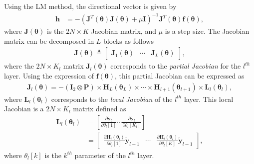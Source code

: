 \documentclass{article}
\begin{document}
Using the LM method, the directional vector is given by
\begin{align}
\mathbf{h}&=-(\mathbf{J}^T(\boldsymbol \theta)\mathbf{J}(\boldsymbol \theta)+\mu \mathbf{I})^{-1}\mathbf{J}^T (\boldsymbol \theta)\mathbf{f}(\boldsymbol \theta),\label{eqgrad2}
\end{align}
where $\mathbf{J}(\boldsymbol \theta)$ is the $2N\times K$ Jacobian matrix, and $\mu$ is a step size. The Jacobian matrix can be decomposed in $L$ blocks as follows 
\begin{align}
\mathbf{J}(\boldsymbol \theta) \triangleq 
\begin{bmatrix}
\mathbf{J}_1(\boldsymbol \theta)&\cdots&\mathbf{J}_L(\boldsymbol \theta)
\end{bmatrix},\label{eqJTOT}
\end{align}
where the $2N\times K_l$ matrix $ \mathbf{J}_l(\boldsymbol \theta)$ corresponds to the \emph{partial Jacobian} for the $l^{th}$ layer. Using the expression of $\mathbf{f}(\boldsymbol \theta)$, this partial Jacobian can be expressed as
\begin{align}
\mathbf{J}_l(\boldsymbol \theta)=-\left(\mathbf{I}_2\otimes \mathbf{P}\right) \times \mathbf{H}_{L}(\boldsymbol \theta_L)\times \cdots \times \mathbf{H}_{l+1}(\boldsymbol \theta_{l+1})\times \mathbf{L}_l(\boldsymbol \theta_l),
\label{eqJl}
\end{align}
where $\mathbf{L}_l(\boldsymbol \theta_l)$ corresponds to the \emph{local Jacobian} of the $l^{th}$ layer. This local Jacobian is a $2N\times K_l$ matrix defined as
\begin{align}
\mathbf{L}_l(\boldsymbol \theta_l)&=\left[
\frac{\partial \tilde{\mathbf{y}}_{l}}{\partial  \theta_l[1]}\cdots\frac{\partial \tilde{\mathbf{y}}_{l}}{\partial \theta_l[K_l]}
\right]\nonumber\\
&= \begin{bmatrix}
\frac{\partial \mathbf{H}_{l}(\boldsymbol \theta_{l}) }{\partial  \theta_l[1]}\tilde{\mathbf{y}}_{l-1}&\cdots&\frac{\partial \mathbf{H}_{l}(\boldsymbol \theta_{l}) }{\partial  \theta_l[K]}\tilde{\mathbf{y}}_{l-1}
\end{bmatrix}\label{eqlocjacob},
\end{align}
where $\theta_l[k]$ is the $k^{th}$ parameter of the $l^{th}$ layer.
\end{document}
